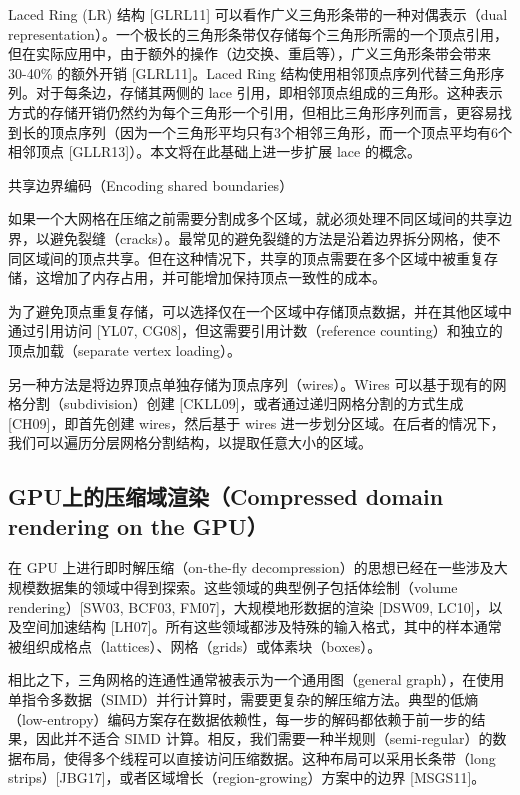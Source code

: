 Laced Ring (LR) 结构 [GLRL11] 可以看作广义三角形条带的一种对偶表示（dual representation）。一个极长的三角形条带仅存储每个三角形所需的一个顶点引用，但在实际应用中，由于额外的操作（边交换、重启等），广义三角形条带会带来 30-40\% 的额外开销 [GLRL11]。Laced Ring 结构使用相邻顶点序列代替三角形序列。对于每条边，存储其两侧的 lace 引用，即相邻顶点组成的三角形。这种表示方式的存储开销仍然约为每个三角形一个引用，但相比三角形序列而言，更容易找到长的顶点序列（因为一个三角形平均只有3个相邻三角形，而一个顶点平均有6个相邻顶点 [GLLR13]）。本文将在此基础上进一步扩展 lace 的概念。

共享边界编码（Encoding shared boundaries）

如果一个大网格在压缩之前需要分割成多个区域，就必须处理不同区域间的共享边界，以避免裂缝（cracks）。最常见的避免裂缝的方法是沿着边界拆分网格，使不同区域间的顶点共享。但在这种情况下，共享的顶点需要在多个区域中被重复存储，这增加了内存占用，并可能增加保持顶点一致性的成本。

为了避免顶点重复存储，可以选择仅在一个区域中存储顶点数据，并在其他区域中通过引用访问 [YL07, CG08]，但这需要引用计数（reference counting）和独立的顶点加载（separate vertex loading）。

另一种方法是将边界顶点单独存储为顶点序列（wires）。Wires 可以基于现有的网格分割（subdivision）创建 [CKLL09]，或者通过递归网格分割的方式生成 [CH09]，即首先创建 wires，然后基于 wires 进一步划分区域。在后者的情况下，我们可以遍历分层网格分割结构，以提取任意大小的区域。

\subsection{GPU上的压缩域渲染（Compressed domain rendering on the GPU）}

在 GPU 上进行即时解压缩（on-the-fly decompression）的思想已经在一些涉及大规模数据集的领域中得到探索。这些领域的典型例子包括体绘制（volume rendering）[SW03, BCF03, FM07]，大规模地形数据的渲染 [DSW09, LC10]，以及空间加速结构 [LH07]。所有这些领域都涉及特殊的输入格式，其中的样本通常被组织成格点（lattices）、网格（grids）或体素块（boxes）。

相比之下，三角网格的连通性通常被表示为一个通用图（general graph），在使用单指令多数据（SIMD）并行计算时，需要更复杂的解压缩方法。典型的低熵（low-entropy）编码方案存在数据依赖性，每一步的解码都依赖于前一步的结果，因此并不适合 SIMD 计算。相反，我们需要一种半规则（semi-regular）的数据布局，使得多个线程可以直接访问压缩数据。这种布局可以采用长条带（long strips）[JBG17]，或者区域增长（region-growing）方案中的边界 [MSGS11]。

